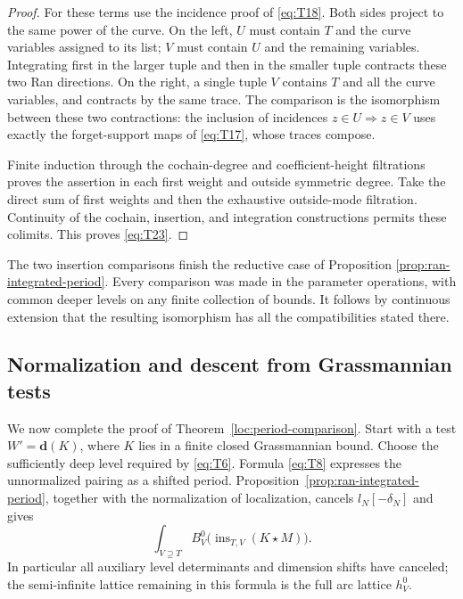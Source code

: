 \documentclass[11pt]{article}
\numberwithin{equation}{section}
\theoremstyle{definition}
\theoremstyle{remark}
\begin{document}
\begin{proof}
For these terms use the incidence proof of \eqref{eq:T18}.  Both sides
project to the same power of the curve.  On the left, $U$ must contain
$T$ and the curve variables assigned to its list; $V$ must contain $U$
and the remaining variables.  Integrating first in the larger tuple and
then in the smaller tuple contracts these two Ran directions.  On the
right, a single tuple $V$ contains $T$ and all the curve variables, and
contracts by the same trace.  The comparison is the isomorphism between
these two contractions: the inclusion of incidences $z\in U\Rightarrow
z\in V$ uses exactly the forget-support maps of \eqref{eq:T17}, whose
traces compose.

Finite induction through the cochain-degree and coefficient-height
filtrations proves the assertion in each first weight and outside
symmetric degree.  Take the direct sum of first weights and then the
exhaustive outside-mode filtration.  Continuity of the cochain,
insertion, and integration constructions permits these colimits.
This proves \eqref{eq:T23}.
\end{proof}

The two insertion comparisons finish the reductive case of Proposition
\ref{prop:ran-integrated-period}.  Every comparison was made in the
parameter operations, with common deeper levels on any finite collection
of bounds.  It follows by continuous extension that the resulting
isomorphism has all the compatibilities stated there.

\subsection{Normalization and descent from Grassmannian tests}

We now complete the proof of Theorem~\ref{loc:period-comparison}.
Start with a test
$W'=\mathbf d(K)$, where $K$ lies in a finite closed Grassmannian bound.
Choose the sufficiently deep level required by \eqref{eq:T6}.  Formula
\eqref{eq:T8} expresses the unnormalized pairing as a shifted period.
Proposition~\ref{prop:ran-integrated-period}, together with the
normalization of localization, cancels $l_N[-\delta_N]$ and gives
\begin{equation}\label{eq:T25}
       \int_{V\supseteq T}
       B^0_V\bigl(\operatorname{ins}_{T,V}(K\star M)\bigr).
\end{equation}
In particular all auxiliary level determinants and dimension shifts have
canceled; the semi-infinite lattice remaining in this formula is the full
arc lattice $h_V^0$.
\end{document}
